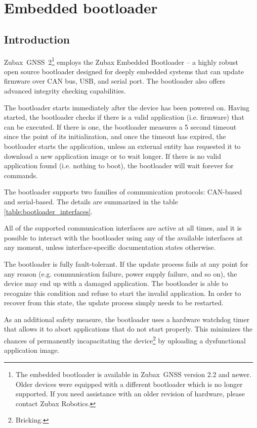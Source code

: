 \documentclass{zubaxdoc}
\begin{document}
\chapter{Embedded bootloader}\label{sec:bootloader}

\section{Introduction}

Zubax~GNSS~2\footnote{The embedded bootloader is available in Zubax~GNSS version 2.2 and newer.
Older devices were equipped with a different bootloader which is no longer supported.
If you need assistance with an older revision of hardware, please contact Zubax Robotics.}
employs the Zubax Embedded Bootloader --
a highly robust open source bootloader designed for deeply embedded systems
that can update firmware over CAN bus, USB, and serial port.
The bootloader also offers advanced integrity checking capabilities.

The bootloader starts immediately after the device has been powered on.
Having started, the bootloader checks if there is a valid application (i.e. firmware) that can be executed.
If there is one, the bootloader measures a 5 second timeout since the point of its initialization,
and once the timeout has expired, the bootloader starts the application,
unless an external entity has requested it to download a new application image or to wait longer.
If there is no valid application found (i.e. nothing to boot),
the bootloader will wait forever for commands.

The bootloader supports two families of communication protocols: CAN-based and serial-based.
The details are summarized in the table \ref{table:bootloader_interfaces}.

All of the supported communication interfaces are active at all times,
and it is possible to interact with the bootloader using any of the available interfaces
at any moment, unless interface-specific documentation states otherwise.

The bootloader is fully fault-tolerant.
If the update process fails at any point for any reason
(e.g. communication failure, power supply failure, and so on),
the device may end up with a damaged application.
The bootloader is able to recognize this condition and refuse to start the invalid application.
In order to recover from this state, the update process simply needs to be restarted.

As an additional safety measure, the bootloader uses a hardware watchdog timer that
allows it to abort applications that do not start properly.
This minimizes the chances of permanently incapacitating the device\footnote{Bricking.}
by uploading a dysfunctional application image.
\end{document}
